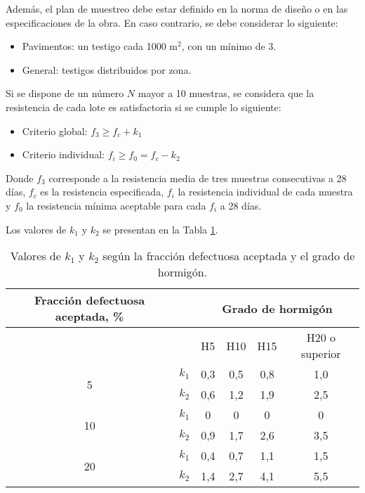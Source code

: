 Además, el plan de muestreo debe estar definido en la norma de diseño o en las especificaciones de la obra. En caso contrario, se debe considerar lo siguiente:

\begin{itemize}
    \item Pavimentos: un testigo cada 1000 m$^2$, con un mínimo de 3.
    \item General: testigos distribuidos por zona.
\end{itemize}

Si se dispone de un número $N$ mayor a 10 muestras, se considera que la resistencia de cada lote es satisfactoria si se cumple lo siguiente:

\begin{itemize}
    \item Criterio global: $f_3 \geq f_c + k_1$
    \item Criterio individual: $f_i \geq f_0 = f_c - k_2$
\end{itemize}

Donde $f_3$ corresponde a la resistencia media de tres muestras consecutivas a 28 días, $f_c$ es la resistencia especificada, $f_i$ la resistencia individual de cada muestra y $f_0$ la resistencia mínima aceptable para cada $f_i$ a 28 días. 

Los valores de $k_1$ y $k_2$ se presentan en la Tabla \ref{tab:valoresk}.

\begin{table}[H]
\centering
\begin{tabular}{|c|c|c|c|c|c|}
\hline
\textbf{Fracción defectuosa aceptada, \%} &  & \multicolumn{4}{c|}{\textbf{Grado de hormigón}} \\ \hline
 &  & H5 & H10 & H15 & H20 o superior \\ \hline
\multirow{2}{*}{5}  & $k_{1}$ & 0,3 & 0,5 & 0,8 & 1,0 \\ \cline{2-6}
                    & $k_{2}$ & 0,6 & 1,2 & 1,9 & 2,5 \\ \hline
\multirow{2}{*}{10} & $k_{1}$ & 0   & 0   & 0   & 0   \\ \cline{2-6}
                    & $k_{2}$ & 0,9 & 1,7 & 2,6 & 3,5 \\ \hline
\multirow{2}{*}{20} & $k_{1}$ & 0,4 & 0,7 & 1,1 & 1,5 \\ \cline{2-6}
                    & $k_{2}$ & 1,4 & 2,7 & 4,1 & 5,5 \\ \hline
\end{tabular}
\caption{Valores de $k_{1}$ y $k_{2}$ según la fracción defectuosa aceptada y el grado de hormigón.}
\label{tab:valoresk}
\end{table}

